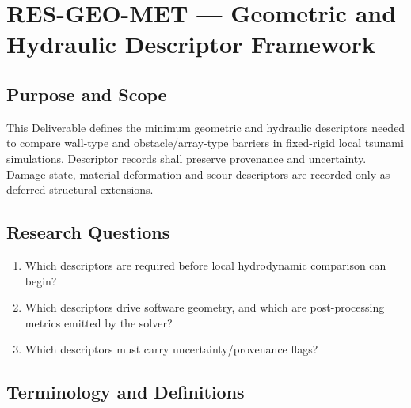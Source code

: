 
\section{RES-GEO-MET --- Geometric and Hydraulic Descriptor Framework}
\label{sec:res-geo-met}

\subsection{Purpose and Scope}
\label{sec:res-geo-met-purpose}

This Deliverable defines the minimum geometric and hydraulic
descriptors needed to compare wall-type and obstacle/array-type
barriers in fixed-rigid local tsunami simulations. Descriptor records
shall preserve provenance and uncertainty. Damage state, material
deformation and scour descriptors are recorded only as deferred
structural extensions.

\subsection{Research Questions}
\label{sec:res-geo-met-research-questions}

\begin{enumerate}
  \item Which descriptors are required before local hydrodynamic
    comparison can begin?
  \item Which descriptors drive software geometry, and which are
    post-processing metrics emitted by the solver?
  \item Which descriptors must carry uncertainty/provenance flags?
\end{enumerate}

\subsection{Terminology and Definitions}
\label{sec:res-geo-met-definitions}

